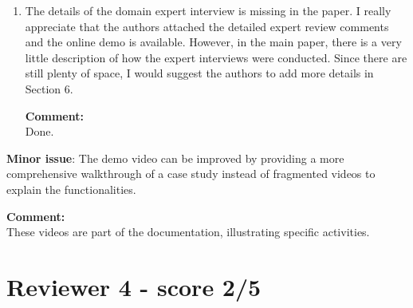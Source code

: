 \documentclass{article}
\newcommand{\reply}[1]{\begin{tcolorbox}\noindent\textbf{Comment:}\\#1\hfill\end{tcolorbox}}
\begin{document}
\begin{itemize}
{\begin{enumerate}
    \item{The details of the domain expert interview is missing in the paper.  
    I really appreciate that the authors attached the detailed expert review comments
    and the online demo is available. However, in the main paper, there is a very
    little description of how the expert interviews were conducted. Since there are
    still plenty of space, I would suggest the authors to add more details in Section
    6.
    \reply{Done.}}
    \end{enumerate}
    \textbf{Minor issue}:
    The demo video can be improved by providing a more comprehensive walkthrough of a
    case study instead of fragmented videos to explain the functionalities.

    \reply{These videos are part of the documentation, illustrating specific
    activities.}}
\end{itemize}

\section{Reviewer 4 - score 2/5}
\end{document}
